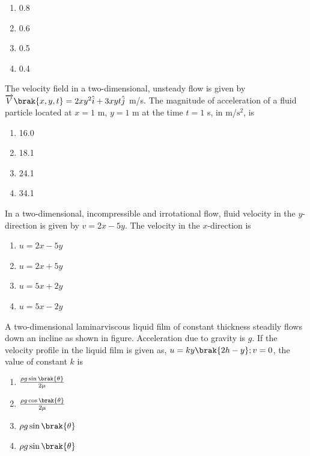  \begin{enumerate}
    \item 0.8
    \item 0.6
    \item 0.5
    \item 0.4 \\
\end{enumerate}
\item The velocity field in a two-dimensional, unsteady flow is given by $\overrightarrow{V}\brak{x,y,t} = 2xy^2\hat{i} + 3xyt\hat{j}$ m/s. The magnitude of acceleration of a fluid particle located at $x = 1$ m, $y = 1$ m at the time $t = 1$ s, in m/$\text{s}^2$, is
\begin{enumerate}
    \item 16.0
    \item 18.1
     \item 24.1
    \item 34.1 \\
\end{enumerate}
\item In a two-dimensional, incompressible and irrotational flow, fluid velocity  in the $y$-direction is given by $v = 2x - 5y$. The velocity  in the $x$-direction is 
\begin{enumerate}
   \item $u = 2x - 5y$
   \item $u = 2x + 5y$
   \item $u = 5x + 2y$
   \item $u = 5x - 2y$ \\
\end{enumerate}
\item A two-dimensional laminarviscous liquid film of constant thickness  steadily flows down an incline as shown in figure. Acceleration due to gravity is $g$. If the velocity profile in the liquid film is given as, $u=ky\brak{2h - y}; v = 0$, the value of constant $k$ is
\begin{figure}[!ht]
\centering
\resizebox{0.5\textwidth}{!}{%

}%
\end{figure}
\begin{enumerate}
    \item $\frac{\rho g \sin\brak{\theta}}{2\mu}$
    \item $\frac{\rho g \cos\brak{\theta}}{2\mu}$
    \item $\rho g \sin\brak{\theta}$
    \item $\rho g \sin\brak{\theta}$ \\
\end{enumerate}
